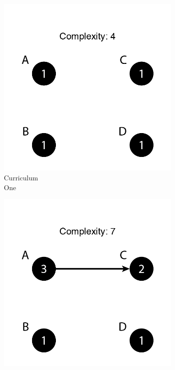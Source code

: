 \documentclass[botnum, fleqn]{unmeethesis}
\begin{document}
    \begin{figure}
      \centering
      \captionsetup{justification=centering}
      \begin{subfigure}[h!]{.20\linewidth}
        \includegraphics[width=\linewidth]{./figures/Simple4.png}
        \caption{Curriculum \\ One}\label{fig:simple4}
      \end{subfigure}
      \begin{subfigure}[h!]{.20\linewidth}
        \includegraphics[width=\linewidth]{./figures/Simple7.png}

\end{subfigure}
\end{figure}
\end{document}
